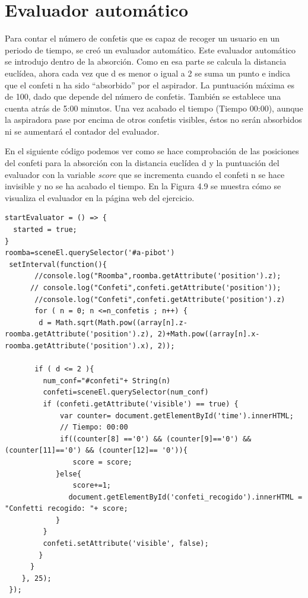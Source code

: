 \section{Evaluador automático}
Para contar el número de confetis que es capaz de recoger un usuario en un periodo de tiempo, se creó un evaluador automático. Este evaluador automático se introdujo dentro de la absorción. Como en esa parte se calcula la distancia euclídea, ahora cada vez que d es menor o igual a 2 se suma un punto e indica que el confeti n ha sido  ``absorbido'' por el aspirador. La puntuación máxima es de 100, dado que depende del número de confetis. También se establece una cuenta atrás de 5:00 minutos. Una vez acabado el tiempo (Tiempo 00:00), aunque la aspiradora pase por encima de otros confetis visibles, éstos no serán absorbidos ni se aumentará el contador del evaluador.

En el siguiente código podemos ver como se hace comprobación de las posiciones del confeti para la absorción con la distancia euclídea d y la puntuación del evaluador con la variable \textit{score} que se incrementa cuando el confeti n se hace invisible y no se ha acabado el tiempo. En la Figura 4.9 se muestra cómo se visualiza el evaluador en la página web del ejercicio.

\begin{lstlisting}
startEvaluator = () => {
  started = true;
}
roomba=sceneEl.querySelector('#a-pibot')
 setInterval(function(){
       //console.log("Roomba",roomba.getAttribute('position').z);
      // console.log("Confeti",confeti.getAttribute('position'));
       //console.log("Confeti",confeti.getAttribute('position').z)
       for ( n = 0; n <=n_confetis ; n++) {
        d = Math.sqrt(Math.pow((array[n].z-roomba.getAttribute('position').z), 2)+Math.pow((array[n].x-roomba.getAttribute('position').x), 2));

       if ( d <= 2 ){
         num_conf="#confeti"+ String(n)
         confeti=sceneEl.querySelector(num_conf)
         if (confeti.getAttribute('visible') == true) {
	         var counter= document.getElementById('time').innerHTML;
		     // Tiempo: 00:00	
	         if((counter[8] =='0') && (counter[9]=='0') && (counter[11]=='0') && (counter[12]== '0')){      
	 	        score = score;
		    }else{
	 	        score+=1;
		       document.getElementById('confeti_recogido').innerHTML = "Confetti recogido: "+ score;
		    }
         }
         confeti.setAttribute('visible', false);
        }
      }
    }, 25);
 });
\end{lstlisting}

